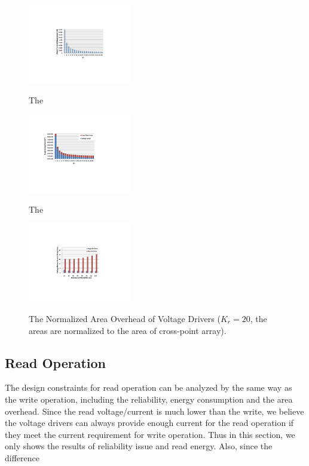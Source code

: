 \begin{figure}%
\centering
  \includegraphics[width=0.4\textwidth]{./figures/non_linear_I.pdf}\\
  \caption{The}\label{fig:non_linear_I}
\end{figure}



\begin{figure}%
\centering
  \includegraphics[width=0.4\textwidth]{./figures/non_linear_ara.pdf}\\
  \caption{The}\label{fig:non_linear_ara}
\end{figure}

\begin{figure}%
\centering
  \includegraphics[width=0.4\textwidth]{./figures/Area_kr20.pdf}\\
  \caption{The Normalized Area Overhead of Voltage Drivers ($K_r=20$, the areas are normalized to the area of cross-point array). }\label{fig:Area_kr20}
\end{figure}
\subsection{Read Operation}
The design constraints for read operation can be analyzed by the same way as the write operation, including the reliability, energy consumption and the area overhead. Since the read voltage/current is much lower than the write, we believe the voltage drivers can always provide enough current for the read operation if they meet the current requirement for write operation. Thus in this section, we only shows the results of reliability issue and read energy. Also, since the difference

